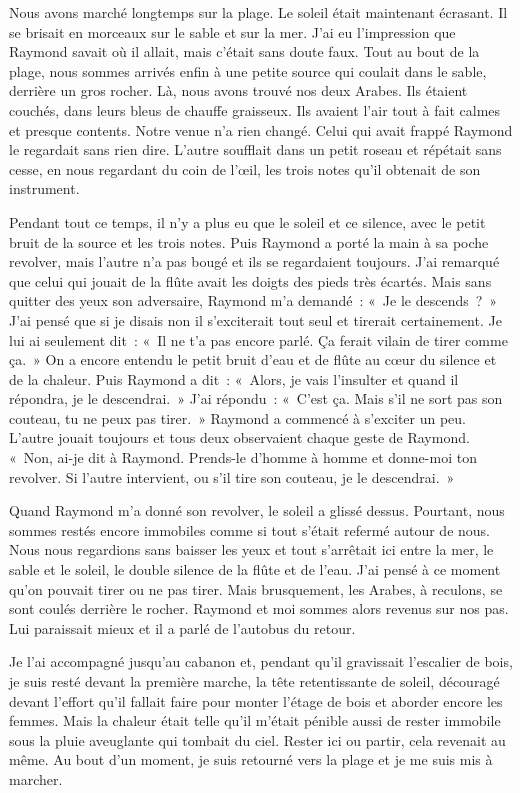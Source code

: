 \documentclass[french,twoside]{book} %
\begin{document}
Nous avons marché longtemps sur la plage. Le soleil était maintenant écrasant. Il se brisait en morceaux sur le sable et sur la mer. J'ai eu l’impression que Raymond savait où il allait, mais c’était sans doute faux. Tout au bout de la plage, nous sommes arrivés enfin à une petite source qui coulait dans le sable, derrière un gros rocher. Là, nous avons trouvé nos deux Arabes. Ils étaient couchés, dans leurs bleus de chauffe graisseux. Ils avaient l’air tout à fait calmes et presque contents. Notre venue n’a rien changé. Celui qui avait frappé Raymond le regardait sans rien dire. L'autre soufflait dans un petit roseau et répétait sans cesse, en nous regardant du coin de l’œil, les trois notes qu’il obtenait de son instrument.\par
Pendant tout ce temps, il n’y a plus eu que le soleil et ce silence, avec le petit bruit de la source et les trois notes. Puis Raymond a porté la main à sa poche revolver, mais l’autre n’a pas bougé et ils se regardaient toujours. J'ai remarqué que celui qui jouait de la flûte avait les doigts des pieds très écartés. Mais sans quitter des yeux son adversaire, Raymond m’a demandé : « Je le descends ? » J'ai pensé que si je disais non il s’exciterait tout seul et tirerait certainement. Je lui ai seulement dit : « Il ne t’a pas encore parlé. Ça ferait vilain de tirer comme ça. » On a encore entendu le petit bruit d’eau et de flûte au cœur du silence et de la chaleur. Puis Raymond a dit : « Alors, je vais l’insulter et quand il répondra, je le descendrai. » J'ai répondu : « C'est ça. Mais s’il ne sort pas son couteau, tu ne peux pas tirer. » Raymond a commencé à s’exciter un peu. L'autre jouait toujours et tous deux observaient chaque geste de Raymond. « Non, ai-je dit à Raymond. Prends-le d’homme à homme et donne-moi ton revolver. Si l’autre intervient, ou s’il tire son couteau, je le descendrai. »\par
Quand Raymond m’a donné son revolver, le soleil a glissé dessus. Pourtant, nous sommes restés encore immobiles comme si tout s’était refermé autour de nous. Nous nous regardions sans baisser les yeux et tout s’arrêtait ici entre la mer, le sable et le soleil, le double silence de la flûte et de l’eau. J'ai pensé à ce moment qu’on pouvait tirer ou ne pas tirer. Mais brusquement, les Arabes, à reculons, se sont coulés derrière le rocher. Raymond et moi sommes alors revenus sur nos pas. Lui paraissait mieux et il a parlé de l’autobus du retour.\par
Je l’ai accompagné jusqu’au cabanon et, pendant qu’il gravissait l’escalier de bois, je suis resté devant la première marche, la tête retentissante de soleil, découragé devant l’effort qu’il fallait faire pour monter l’étage de bois et aborder encore les femmes. Mais la chaleur était telle qu’il m’était pénible aussi de rester immobile sous la pluie aveuglante qui tombait du ciel. Rester ici ou partir, cela revenait au même. Au bout d’un moment, je suis retourné vers la plage et je me suis mis à marcher.\par
\end{document}
